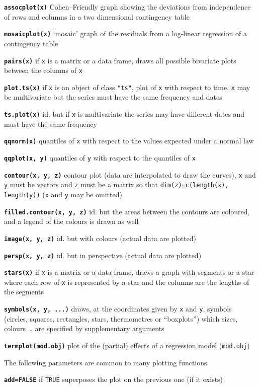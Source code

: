\documentclass[8pt,landscape]{article}
\newcommand{\code}{\texttt}
\newcommand{\bcode}[1]{\texttt{\textbf{#1}}}
\newcommand\T{\code{TRUE}}
\begin{document}
\begin{multicols*}{3}
\bcode{assocplot(x)}  Cohen--Friendly graph showing the deviations  from independence of rows and columns in a two dimensional contingency table

\bcode{mosaicplot(x)}  `mosaic' graph of the residuals from a log-linear regression of a contingency table

\bcode{pairs(x)}  if \code{x} is a matrix or a data frame, draws all possible bivariate plots between the columns of \code{x}

\bcode{plot.ts(x)}  if \code{x} is an object of class \code{"ts"}, plot of \code{x} with respect to time, \code{x}  may be multivariate but the series must have the same frequency and dates

\bcode{ts.plot(x)}  id. but if \code{x} is multivariate the series may have different dates and must have the same frequency

\bcode{qqnorm(x)}  quantiles of \code{x} with respect to the values expected under a normal law

\bcode{qqplot(x, y)}  quantiles of \code{y} with respect to the quantiles of \code{x}

\bcode{contour(x, y, z)}  contour plot (data are interpolated to draw the curves), \code{x} and \code{y} must be vectors and \code{z} must be a matrix so that \code{dim(z)=c(length(x), length(y))} (\code{x} and \code{y} may be omitted)

\bcode{filled.contour(x, y, z)}  id. but the areas between the contours are coloured, and a legend of the colours is drawn as well

\bcode{image(x, y, z)}  id. but with colours (actual data are plotted)

\bcode{persp(x, y, z)}  id. but in perspective (actual data are plotted)

\bcode{stars(x)}  if \code{x} is a matrix or a data frame, draws a graph with segments or a star where each row of \code{x} is represented by a star and the columns are the lengths of the segments

\bcode{symbols(x, y, ...)}  draws, at the coordinates given by \code{x} and \code{y}, symbols (circles, squares, rectangles, stars, thermometres or ``boxplots'') which sizes, colours \ldots{} are specified by supplementary arguments

\bcode{termplot(mod.obj)}  plot of the (partial) effects of a regression model (\code{mod.obj})

The following parameters are common to many plotting functions:

\bcode{add=FALSE}  if \T{} superposes the plot on the previous one (if it exists)


\end{multicols*}
\end{document}
